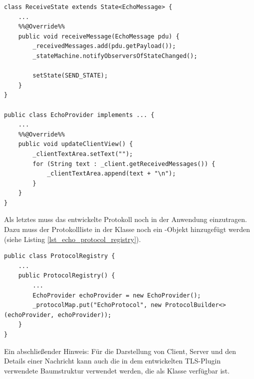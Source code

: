 \begin{lstlisting}[style=java, caption=Aktualisierungsmechanismus bei Zustandsänderung, label=lst_echo_state_changed]
class ReceiveState extends State<EchoMessage> {
	...
	%%@Override%%
	public void receiveMessage(EchoMessage pdu) {
		_receivedMessages.add(pdu.getPayload());
		_stateMachine.notifyObserversOfStateChanged();

		setState(SEND_STATE);
	}
}

public class EchoProvider implements ... {
	...
	%%@Override%%
	public void updateClientView() {
		_clientTextArea.setText("");
		for (String text : _client.getReceivedMessages()) {
			_clientTextArea.append(text + "\n");
		}
	}
}
\end{lstlisting}

Als letztes muss das entwickelte Protokoll noch in der Anwendung einzutragen. Dazu muss der Protokollliste in der Klasse  noch ein -Objekt hinzugefügt werden (siehe Listing \ref{lst_echo_protocol_registry}).

\begin{lstlisting}[style=java, caption=Protokollregistrierung, label=lst_echo_protocol_registry]
public class ProtocolRegistry {
	...
	public ProtocolRegistry() {
		...
		EchoProvider echoProvider = new EchoProvider();
		_protocolMap.put("EchoProtocol", new ProtocolBuilder<>(echoProvider, echoProvider));
	}	
}
\end{lstlisting}

Ein abschließender Hinweis: Für die Darstellung von Client, Server und den Details einer Nachricht kann auch die in dem entwickelten TLS-Plugin verwendete Baumstruktur verwendet werden, die als Klasse  verfügbar ist.